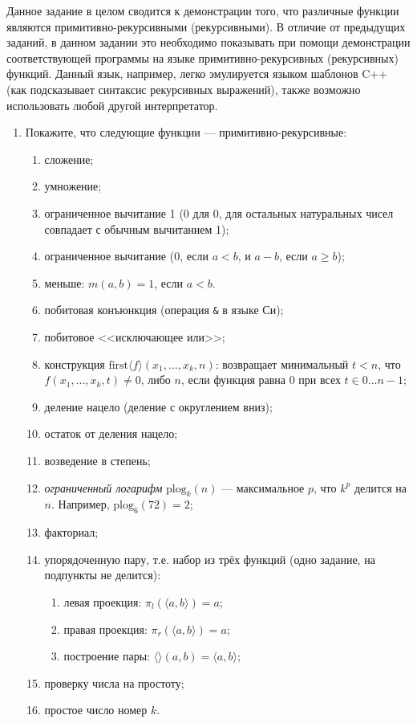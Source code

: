\documentclass[10pt,a4paper,oneside]{article}
\begin{document}
Данное задание в целом сводится к демонстрации того, что различные функции являются
примитивно-рекурсивными (рекурсивными). В отличие от предыдущих заданий, в данном задании
это необходимо показывать при помощи демонстрации соответствующей программы на языке 
примитивно-рекурсивных (рекурсивных) функций.
Данный язык, например, легко эмулируется языком шаблонов C++ (как подсказывает синтаксис 
рекурсивных выражений), также возможно использовать любой другой интерпретатор.

\begin{enumerate}
\item Покажите, что следующие функции --- примитивно-рекурсивные:

\begin{enumerate}
\item сложение;
\item умножение;
\item ограниченное вычитание 1 (0 для 0, для остальных натуральных чисел совпадает с обычным вычитанием 1);
\item ограниченное вычитание (0, если $a < b$, и $a-b$, если $a \ge b$);
\item меньше: $m(a,b) = 1$, если $a < b$.
\item побитовая конъюнкция (операция \verb!&! в языке Си);
\item побитовое <<исключающее или>>;
\item конструкция $\textrm{first}\langle f \rangle(x_1,\dots,x_k,n)$: возвращает минимальный $t < n$, что
$f(x_1,\dots,x_k,t) \ne 0$, либо $n$, если функция равна 0 при всех $t \in 0\dots {n-1}$;
\item деление нацело (деление с округлением вниз);
\item остаток от деления нацело;
\item возведение в степень;
\item \emph{ограниченный логарифм} $\textrm{plog}_k(n)$ --- максимальное $p$, что $k^p$ делится на $n$.
Например, $\textrm{plog}_6(72) = 2$;
\item факториал;
\item упорядоченную пару, т.е. набор из трёх функций (одно задание, на подпункты не делится):
\begin{enumerate}
\item левая проекция: $\pi_l (\langle a,b\rangle) = a$;
\item правая проекция: $\pi_r (\langle a,b\rangle) = a$;
\item построение пары: $\langle\rangle (a,b) = \langle a,b\rangle$;
\end{enumerate}
\item проверку числа на простоту;
\item простое число номер $k$.
\end{enumerate}


\end{enumerate}
\end{document}
